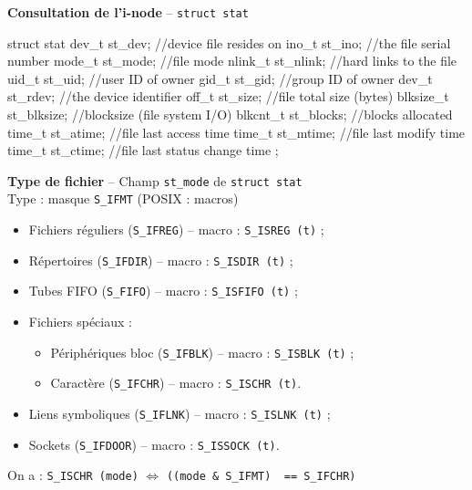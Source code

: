 \documentclass[french]{scrartcl}
\begin{document}
\begin{multicols}{3}
\vskip 5pt 
\textbf{Consultation de l'i-node} -- \lstinline!struct stat!
\vspace{-12pt}\begin{verbatimtab}[2\scriptsize]
struct stat {
	dev_t			st_dev;			//device file resides on
	ino_t			st_ino;			//the file serial number
	mode_t		st_mode;		//file mode
	nlink_t		st_nlink;		//hard links to the file
	uid_t			st_uid;			//user ID of owner
	gid_t			st_gid;			//group ID of owner
	dev_t			st_rdev;		//the device identifier
	off_t			st_size;		//file total size (bytes)
	blksize_t	st_blksize; //blocksize (file system I/O)
	blkcnt_t	st_blocks; 	//blocks allocated
	time_t		st_atime;		//file last access time
	time_t		st_mtime;		//file last modify time
	time_t		st_ctime;		//file last status change time
};
\end{verbatimtab}
\vspace{-10pt}
\textbf{Type de fichier} -- Champ \lstinline!st_mode! de \lstinline!struct stat!\\
Type : masque \lstinline!S_IFMT! (POSIX : macros)
\begin{itemize}
	\item Fichiers réguliers (\lstinline!S_IFREG!) -- macro : \lstinline!S_ISREG (t)! ;
	\item Répertoires (\lstinline!S_IFDIR!) -- macro : \lstinline!S_ISDIR (t)! ;
	\item Tubes FIFO (\lstinline!S_FIFO!) -- macro : \lstinline!S_ISFIFO (t)! ;
	\item Fichiers spéciaux : \begin{itemize}
		\item Périphériques bloc (\lstinline!S_IFBLK!) -- macro : \lstinline!S_ISBLK (t)! ;
		\item Caractère (\lstinline!S_IFCHR!) -- macro : \lstinline!S_ISCHR (t)!.
	\end{itemize}
	\item Liens symboliques (\lstinline!S_IFLNK!) -- macro : \lstinline!S_ISLNK (t)! ;
	\item Sockets (\lstinline!S_IFDOOR!) -- macro : \lstinline!S_ISSOCK (t)!.
\end{itemize}
On a : \lstinline!S_ISCHR (mode)! $\Leftrightarrow$ \lstinline!((mode & S_IFMT)  == S_IFCHR)!


\end{multicols}
\end{document}
